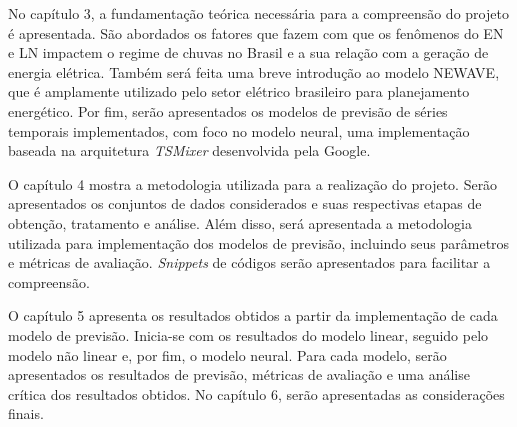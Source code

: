 No capítulo 3, a fundamentação teórica necessária para a compreensão do projeto é apresentada. São abordados os fatores
que fazem com que os fenômenos do EN e LN impactem o regime de chuvas no Brasil e a sua relação com a geração de 
energia elétrica. Também será feita uma breve introdução ao modelo NEWAVE,
que é amplamente utilizado pelo setor elétrico brasileiro para planejamento energético. Por fim, serão apresentados os modelos 
de previsão de séries temporais implementados, com foco no modelo neural, uma implementação baseada na arquitetura 
\textit{TSMixer} desenvolvida pela Google.

O capítulo 4 mostra a metodologia utilizada para a realização do projeto. Serão apresentados os conjuntos de dados
considerados e suas respectivas etapas de obtenção, tratamento e análise. Além disso, será apresentada a metodologia
utilizada para implementação dos modelos de previsão, incluindo seus parâmetros e métricas de avaliação. \textit{Snippets}
de códigos serão apresentados para facilitar a compreensão.

O capítulo 5 apresenta os resultados obtidos a partir da implementação de cada modelo de previsão. Inicia-se com os resultados
do modelo linear, seguido pelo modelo não linear e, por fim, o modelo neural. Para cada modelo, serão apresentados os
resultados de previsão, métricas de avaliação e uma análise crítica dos resultados obtidos. No capítulo 6, serão apresentadas 
as considerações finais.



